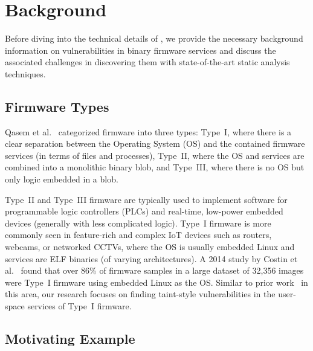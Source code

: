 \section{Background}
\label{sec:background}

Before diving into the technical details of \mango, we provide the necessary background information on vulnerabilities in binary firmware services and discuss the associated challenges in discovering them with state-of-the-art static analysis techniques.

\subsection{Firmware Types}

Qasem et al.~\cite{qasem2021automatic} categorized firmware into three types:
Type~I, where there is a clear separation between the Operating System (OS) and the contained firmware services (in terms of files and processes), Type~II, where the OS and services are combined into a monolithic binary blob, and Type~III, where there is no OS but only logic embedded in a blob.

Type~II and Type~III firmware are typically used to implement software for programmable logic controllers (PLCs) and real-time, low-power embedded devices (generally with less complicated logic).
Type~I firmware is more commonly seen in feature-rich and complex IoT devices such as routers, webcams, or networked CCTVs, where the OS is usually embedded Linux and services are ELF binaries (of varying architectures).
A 2014 study by Costin et al.~\cite{costin2014large} found that over 86\% of firmware samples in a large dataset of 32,356 images were Type~I firmware using embedded Linux as the OS.
Similar to prior work~\cite{celik2018sensitive,mandal2020cross} in this area, our research focuses on finding taint-style vulnerabilities in the user-space services of Type~I firmware.


\subsection{Motivating Example}
\label{sec:motivating_example}



